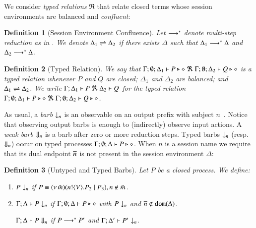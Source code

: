 \documentclass[preprint,11pt]{elsarticle}
\newtheorem{definition}{Definition}[section]
\begin{document}
We consider \emph{typed relations} $\Re$ that relate  closed terms whose
session environments %
are balanced  and \emph{confluent}:

\begin{definition}[Session Environment Confluence]
Let $\longrightarrow^\ast$ denote multi-step reduction as in .
	We denote $\Delta_1 \rightleftharpoons \Delta_2$ if there exists $\Delta$ such that
	$\Delta_1 \longrightarrow^\ast \Delta$ and $\Delta_2 \longrightarrow^\ast \Delta$.
\end{definition}



\begin{definition}[Typed Relation]
	We say that
	$\Gamma; \emptyset; \Delta_1 \vdash P \triangleright \diamond\ \Re \ \Gamma; \emptyset; \Delta_2 \vdash Q \triangleright \diamond$
	is a {\em typed relation} whenever
	$P$ and $Q$ are closed;
	$\Delta_1$ and $\Delta_2$ are balanced; and 
	$\Delta_1 \rightleftharpoons \Delta_2$.
	We write $\horel{\Gamma}{\Delta_1}{P}{\ \Re \ }{\Delta_2}{Q}$
	for the typed relation $\Gamma; \emptyset; \Delta_1 \vdash P \triangleright \diamond\ \Re \ \Gamma; \emptyset; \Delta_2 \vdash Q \triangleright \diamond$.
\end{definition}


As usual, a \emph{barb} $\downarrow_{n}$ is an observable on an output prefix with subject $n$~\cite{MiSa92}.
Notice that observing output barbs is enough to (indirectly) observe input actions.
A \emph{weak barb} $\Downarrow_{n}$ is a barb after zero or more reduction steps.
Typed barbs $\downarrow_{n}$ (resp.\ $\Downarrow_{n}$)
occur on typed processes $\Gamma; \emptyset; \Delta \vdash P \triangleright \diamond$.
When $n$ is a session name we require that its dual endpoint $\overline{n}$ is not present
in the session environment $\Delta$:

\begin{definition}[Untyped and Typed Barbs]\label{d:barb}%
	Let $P$ be a closed process. We define:
	\begin{enumerate}[1.]
		\item	
		$P \downarrow_{n}$ if $P \equiv (\nu\, \tilde{m})(n ! \langle V \rangle . P_2 \;|\; P_3), n \notin \tilde{m}$. %

		\item	$\Gamma; \Delta \vdash P \downarrow_{n}$ if
			$\Gamma; \emptyset; \Delta \vdash P \triangleright \diamond$ with $P \downarrow_{n}$ and $\overline{n} \notin \mathtt{dom}(\Delta)$.

			$\Gamma; \Delta \vdash P \Downarrow_{n}$ if $P \longrightarrow^* P'$ and
			$\Gamma; \Delta' \vdash P' \downarrow_{n}$.			
	\end{enumerate}
\end{definition}
\end{document}
